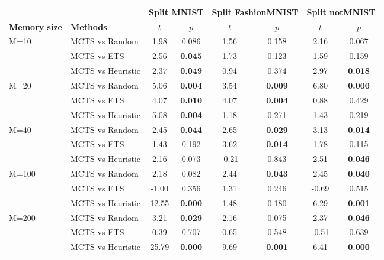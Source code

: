 \begin{tabular}{llcccccc}
\toprule
                       &                  & \multicolumn{2}{c}{\textbf{Split MNIST}} & \multicolumn{2}{c}{\textbf{Split FashionMNIST}} & \multicolumn{2}{c}{\textbf{Split notMNIST}} \\
\cmidrule(lr){3-4} \cmidrule(lr){5-6} \cmidrule(lr){7-8}
\textbf{Memory size}   & \textbf{Methods} & $t$                & $p$                   & $t$                    & $p$                      & $t$                  & $p$                    \\
\midrule
\multirow{3}{*}{M=10}  & MCTS vs Random  & 1.98   & 0.086           & 1.56       & 0.158              & 2.16     & 0.067            \\
                       & MCTS vs ETS     & 2.56   & \textbf{0.045}  & 1.73       & 0.123              & 1.59     & 0.159            \\
                       & MCTS vs Heuristic & 2.37   & \textbf{0.049}  & 0.94       & 0.374              & 2.97     & \textbf{0.018}   \\
\midrule
\multirow{3}{*}{M=20}  & MCTS vs Random  & 5.06   & \textbf{0.004}  & 3.54       & \textbf{0.009}     & 6.80     & \textbf{0.000}   \\
                       & MCTS vs ETS     & 4.07   & \textbf{0.010}  & 4.07       & \textbf{0.004}     & 0.88     & 0.429            \\
                       & MCTS vs Heuristic & 5.08   & \textbf{0.004}  & 1.18       & 0.271              & 1.43     & 0.219            \\
\midrule
\multirow{3}{*}{M=40}  & MCTS vs Random  & 2.45   & \textbf{0.044}  & 2.65       & \textbf{0.029}     & 3.13     & \textbf{0.014}   \\
                       & MCTS vs ETS     & 1.43   & 0.192           & 3.62       & \textbf{0.014}     & 1.78     & 0.115            \\
                       & MCTS vs Heuristic & 2.16   & 0.073           & -0.21      & 0.843              & 2.51     & \textbf{0.046}   \\
\midrule
\multirow{3}{*}{M=100} & MCTS vs Random  & 2.18   & 0.082           & 2.44       & \textbf{0.043}     & 2.45     & \textbf{0.040}   \\
                       & MCTS vs ETS     & -1.00  & 0.356           & 1.31       & 0.246              & -0.69    & 0.515            \\
                       & MCTS vs Heuristic & 12.55  & \textbf{0.000}  & 1.48       & 0.180              & 6.29     & \textbf{0.001}   \\
\midrule
\multirow{3}{*}{M=200} & MCTS vs Random  & 3.21   & \textbf{0.029}  & 2.16       & 0.075              & 2.37     & \textbf{0.046}   \\
                       & MCTS vs ETS     & 0.39   & 0.707           & 0.65       & 0.548              & -0.51    & 0.639            \\
                       & MCTS vs Heuristic & 25.79  & \textbf{0.000}  & 9.69       & \textbf{0.001}     & 6.41     & \textbf{0.000}  \\
\bottomrule
\end{tabular}
